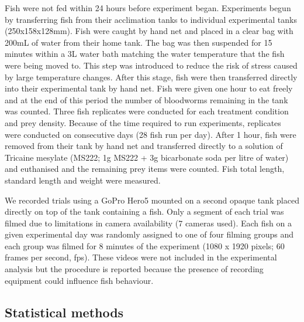 \documentclass[ASNA,twocolumn]{USG} %
\begin{document}
Fish were not fed within 24 hours before experiment began. Experiments begun by transferring fish from their acclimation tanks to individual experimental tanks (250x158x128mm). Fish were caught by hand net and placed in a clear bag with 200mL of water from their home tank. The bag was then suspended for 15 minutes within a 3L water bath matching the water temperature that the fish were being moved to. This step was introduced to reduce the risk of stress caused by large temperature changes. After this stage, fish were then transferred directly into their experimental tank by hand net. Fish were given one hour to eat freely and at the end of this period the number of bloodworms remaining in the tank was counted. Three fish replicates were conducted for each treatment condition and prey density. Because of the time required to run experiments, replicates were conducted on consecutive days (28 fish run per day).  After 1 hour, fish were removed from their tank by hand net and transferred directly to a solution of Tricaine mesylate (MS222; 1g MS222 + 3g bicarbonate soda per litre of water) and euthanised and the remaining prey items were counted. Fish total length, standard length and weight were measured. 

We recorded trials using a GoPro Hero5 mounted on a second opaque tank placed directly on top of the tank containing a fish. Only a segment of each trial was filmed due to limitations in camera availability (7 cameras used). Each fish on a given experimental day was randomly assigned to one of four filming groups and each group was filmed for 8 minutes of the experiment (1080 x 1920 pixels; 60 frames per second, fps). These videos were not included in the experimental analysis but the procedure is reported because the presence of recording equipment could influence fish behaviour.  

\subsection{Statistical methods}
\end{document}
